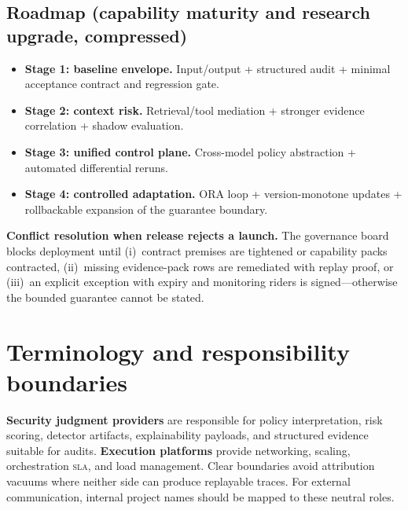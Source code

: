 \documentclass[11pt,a4paper]{report}
\begin{document}
\section{Roadmap (capability maturity and research upgrade, compressed)}
\begin{itemize}
  \item \textbf{Stage 1: baseline envelope.} Input/output \Guardrails{} + structured audit + minimal acceptance contract and regression gate.
  \item \textbf{Stage 2: context risk.} Retrieval/tool mediation + stronger evidence correlation + shadow evaluation.
  \item \textbf{Stage 3: unified control plane.} Cross-model policy abstraction + automated differential reruns.
  \item \textbf{Stage 4: controlled adaptation.} ORA loop + version-monotone updates + rollbackable expansion of the guarantee boundary.
\end{itemize}

\noindent\textbf{Conflict resolution when release rejects a launch.} The governance board blocks deployment until (i)~contract premises are tightened or capability packs contracted, (ii)~missing evidence-pack rows are remediated with replay proof, or (iii)~an explicit exception with expiry and monitoring riders is signed---otherwise the bounded guarantee cannot be stated.

\chapter{Terminology and responsibility boundaries}
\textbf{Security judgment providers} are responsible for policy interpretation, risk scoring, detector artifacts, explainability payloads, and structured evidence suitable for audits. \textbf{Execution platforms} provide networking, scaling, orchestration \textsc{sla}, and load management. Clear boundaries avoid attribution vacuums where neither side can produce replayable traces. For external communication, internal project names should be mapped to these neutral roles.
\end{document}
